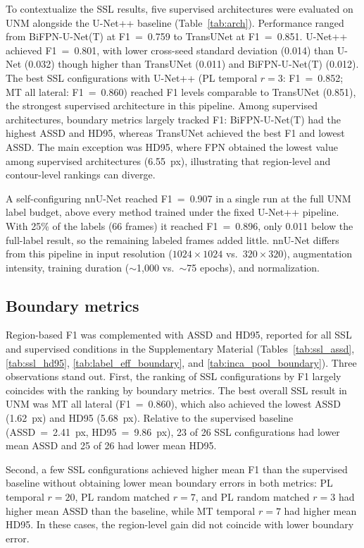 \documentclass[a4paper,fleqn]{cas-dc}
\begin{document}
{\sloppy
To contextualize the SSL results, five supervised architectures were evaluated on UNM alongside the U-Net++ baseline (Table~\ref{tab:arch}). Performance ranged from BiFPN-U-Net(T) at F1~=~0.759 to TransUNet at F1~=~0.851. U-Net++ achieved F1~=~0.801, with lower cross-seed standard deviation (0.014) than U-Net (0.032) though higher than TransUNet (0.011) and BiFPN-U-Net(T) (0.012). The best SSL configurations with U-Net++ (PL temporal $r{=}3$: F1~=~0.852; MT all lateral: F1~=~0.860) reached F1 levels comparable to TransUNet (0.851), the strongest supervised architecture in this pipeline. Among supervised architectures, boundary metrics largely tracked F1: BiFPN-U-Net(T) had the highest ASSD and HD95, whereas TransUNet achieved the best F1 and lowest ASSD. The main exception was HD95, where FPN obtained the lowest value among supervised architectures (6.55~px), illustrating that region-level and contour-level rankings can diverge.

A self-configuring nnU-Net reached F1~=~0.907 in a single run at the full UNM label budget, above every method trained under the fixed U-Net++ pipeline. With 25\% of the labels (66 frames) it reached F1~=~0.896, only 0.011 below the full-label result, so the remaining labeled frames added little. nnU-Net differs from this pipeline in input resolution ($1024{\times}1024$ vs.\ $320{\times}320$), augmentation intensity, training duration ($\sim$1{,}000 vs.\ ${\sim}$75 epochs), and normalization.
\par}

\subsection{Boundary metrics}
\label{sec:boundary_results}

Region-based F1 was complemented with ASSD and HD95, reported for all SSL and supervised conditions in the Supplementary Material (Tables~\ref{tab:ssl_assd}, \ref{tab:ssl_hd95}, \ref{tab:label_eff_boundary}, and \ref{tab:inca_pool_boundary}). Three observations stand out. First, the ranking of SSL configurations by F1 largely coincides with the ranking by boundary metrics. The best overall SSL result in UNM was MT all lateral (F1~=~0.860), which also achieved the lowest ASSD (1.62~px) and HD95 (5.68~px). Relative to the supervised baseline (ASSD~=~2.41~px, HD95~=~9.86~px), 23 of 26 SSL configurations had lower mean ASSD and 25 of 26 had lower mean HD95.

Second, a few SSL configurations achieved higher mean F1 than the supervised baseline without obtaining lower mean boundary errors in both metrics: PL temporal $r{=}20$, PL random matched $r{=}7$, and PL random matched $r{=}3$ had higher mean ASSD than the baseline, while MT temporal $r{=}7$ had higher mean HD95. In these cases, the region-level gain did not coincide with lower boundary error.
\end{document}
